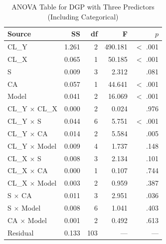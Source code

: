 \documentclass[12pt]{article}
\begin{document}
\begin{table}[h]
    \centering
    \caption{ANOVA Table for DGP with Three Predictors (Including Categorical)}
    \label{tab:anova_v3}
    \vspace{0.2cm}
    \begin{tabular}{lrrrr}
        \toprule
        Source & SS & df & F & $p$ \\
        \midrule
        CL\_Y           & 1.261  & 2   & 490.181  & $<$ .001 \\
        CL\_X           & 0.065  & 1   & 50.185   & $<$ .001 \\
        S              & 0.009  & 3   & 2.312    & .081  \\
        CA             & 0.057  & 1   & 44.641   & $<$ .001 \\
        Model          & 0.041  & 2   & 16.069   & $<$ .001 \\
        CL\_Y $\times$ CL\_X  & 0.000  & 2   & 0.024    & .976  \\
        CL\_Y $\times$ S      & 0.044  & 6   & 5.751    & $<$ .001 \\
        CL\_Y $\times$ CA     & 0.014  & 2   & 5.584    & .005  \\
        CL\_Y $\times$ Model  & 0.009  & 4   & 1.737    & .148  \\
        CL\_X $\times$ S      & 0.008  & 3   & 2.134    & .101  \\
        CL\_X $\times$ CA     & 0.000  & 1   & 0.107    & .744  \\
        CL\_X $\times$ Model  & 0.003  & 2   & 0.959    & .387  \\
        S $\times$ CA         & 0.011  & 3   & 2.951    & .036  \\
        S $\times$ Model      & 0.008  & 6   & 1.041    & .403  \\
        CA $\times$ Model     & 0.001  & 2   & 0.492    & .613  \\
        Residual       & 0.133  & 103  & ---       & ---    \\
        \bottomrule
    \end{tabular}
\end{table}
\end{document}
